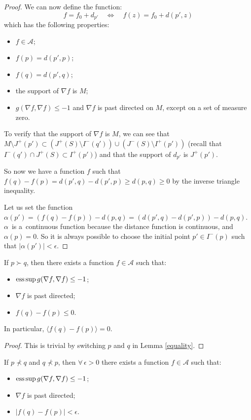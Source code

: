 \documentclass[pdftex]{sigma}
\newcommand{\abs}[1]{\left\vert {#1} \right\vert}
\newcommand{\parenthese}[1]{\left( {#1} \right)}
\newcommand{\Lequi}{\Longleftrightarrow}
\begin{document}
\begin{proof}
We can now def\/ine the function:
\[
f = f_0 + d_{p'}  \quad \Lequi \quad f(z) = f_0 + d(p',z)
\]
which has the following properties:
\begin{itemize}\itemsep=0pt
\item $f\in\mathcal A$;
\item $f(p)= d(p',p)$;
\item $f(q)= d(p',q)$;
\item the support of $\nabla f$ is $M$;
\item $g( \nabla f, \nabla f) \leq -1$ and $\nabla f$ is past directed on $M$, except on a set of measure zero.
\end{itemize}

To verify that the support of $\nabla f$ is $M$, we can see that $M \setminus J^+(p') \subset \parenthese{J^+(S) \setminus I^-(q')} \cup  \parenthese{J^-(S) \setminus I^+(p')} $ (recall that $I^-(q') \cap J^+(S) \subset I^+(p')$) and that the support of $d_{p'}$ is $J^+(p')$.

So now we have a function $f$ such that $f(q)-f(p) = d(p',q) - d(p',p) \geq d(p,q) \geq 0$ by the inverse triangle inequality.

Let us set the function $\alpha(p') = \parenthese{f(q) - f(p)} - d(p,q) = \parenthese{d(p',q) - d(p',p)} - d(p,q)$. $\alpha$~is a~continuous function because the distance function is continuous, and $\alpha(p) = 0$. So it is always possible to choose the initial point $p' \in I^-(p)$ such that $\abs{\alpha(p')} < \epsilon$.
\end{proof}

\begin{corollary}\label{equalityrev}
If $p \succ q$, then there exists a function $f\in \mathcal A$ such that:
\begin{itemize}\itemsep=0pt
\item $\text{\rm ess} \sup g( \nabla f, \nabla f ) \leq -1$;
\item $\nabla f$ is past directed;
\item $f(q)-f(p) \leq 0$.
\end{itemize}
In particular, $\langle f(q)-f(p) \rangle = 0$.

\end{corollary}

\begin{proof}
This is trivial by switching $p$ and $q$ in Lemma \ref{equality}.
\end{proof}

\begin{lemma}\label{zero}
If $p \nprec q$ and $q \nprec p$, then $\forall \, \epsilon > 0$ there exists a function $f\in \mathcal A$ such that:
\begin{itemize}
\item $\text{\rm ess} \sup g( \nabla f, \nabla f ) \leq -1$;
\item $\nabla f$ is past directed;
\item $\abs{f(q)-f(p)} < \epsilon$.
\end{itemize}
\end{lemma}
\end{document}
